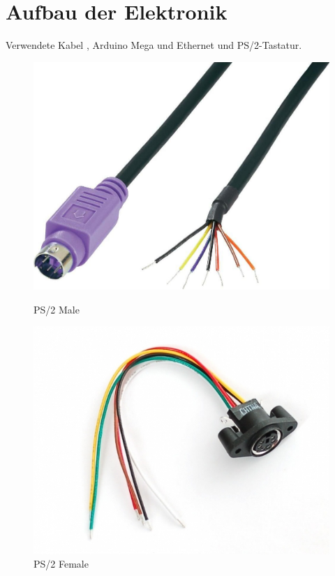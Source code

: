 \section{Aufbau der Elektronik}
Verwendete Kabel \cite{ps2male} \cite{ps2female}, Arduino Mega und Ethernet \cite{arduino} und PS/2-Tastatur.
\begin{figure}
  \centering
  \begin{minipage}{0.45\textwidth}
    \centering
    \includegraphics[width=1\textwidth]{images/ps2_male.jpg}
    \caption{PS/2 Male}
    \label{ps2_male}
  \end{minipage}
  \begin{minipage}{0.45\textwidth}
    \centering
    \includegraphics[width=1\textwidth]{images/ps2_female.jpg}
    \caption{PS/2 Female}
    \label{ps2_female}
  \end{minipage}
\end{figure}

